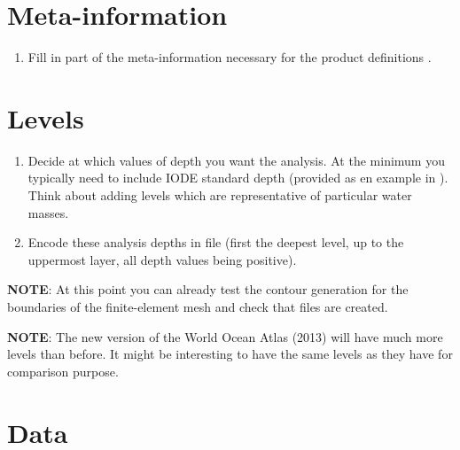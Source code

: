 \documentclass[a4paper,12pt,oneside,notitlepage]{book}
\newcommand{\file}[1]{\texttt{\color{MidnightBlue}{#1}}}
\newcommand{\command}[1]{\texttt{\color{RedOrange}{#1}}}
\begin{document}


\section{Meta-information}

\begin{enumerate}
\item Fill in part of the meta-information necessary for the product definitions \file{NCDFinfo}.
\end{enumerate}


\section{Levels}

\begin{enumerate}
\item Decide at which values of depth you want the analysis. At the minimum you typically need to include IODE standard depth (provided as en example in \file{ contour.depth.iode}). Think about adding levels which are representative of particular water masses.
\item Encode these analysis depths  in file \file{contour.depth} (first the deepest level, up to the uppermost layer, all depth values being positive).
\end{enumerate}

{\bf NOTE}: At this point you can already test the contour generation for the boundaries of the finite-element mesh and check that \file{coast.cont.100xx} files are created.

{\bf NOTE}: The new version of the World Ocean Atlas (2013) will have much more levels than before. It might be interesting to have the same levels as they have for comparison purpose.

\section{Data}
\end{document}
